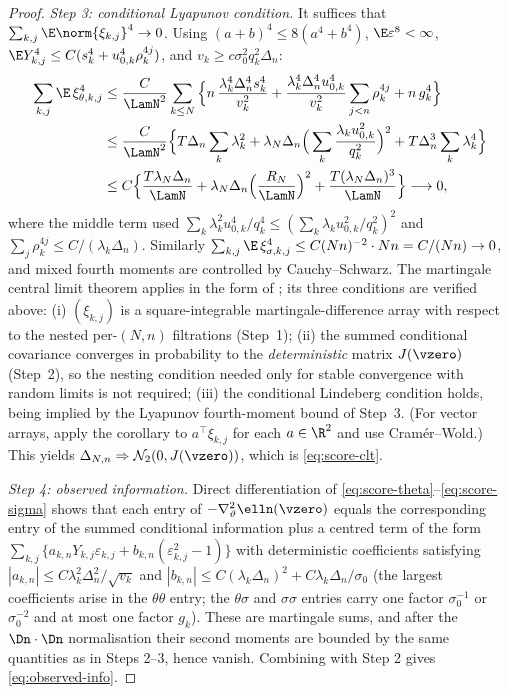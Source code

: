 \begin{proof}
\emph{Step 3: conditional Lyapunov condition.}
It suffices that $\sum_{k,j}\E\norm{\xi_{k,j}}^4\to0$. Using
$(a+b)^4\le8(a^4+b^4)$, $\E\varepsilon^8<\infty$, $\E Y_{k,j}^4\le
C(s_k^4+u_{0,k}^4\rho_k^{4j})$, and $v_k\ge c\sigma_0^2q_k^2\Delta_n$:
\begin{align*}
 \sum_{k,j}\E\,\xi_{\theta,k,j}^4
 &\le\frac{C}{\LamN^2}\sum_{k\le N}
 \Big\{n\,\frac{\lambda_k^4\Delta_n^4s_k^4}{v_k^2}
 +\frac{\lambda_k^4\Delta_n^4u_{0,k}^4}{v_k^2}\sum_{j<n}\rho_k^{4j}
 +n\,g_k^4\Big\}\\
 &\le\frac{C}{\LamN^2}\Big\{T\Delta_n\sum_k\lambda_k^2
 +\lambda_N\Delta_n\Big(\sum_k\frac{\lambda_ku_{0,k}^2}{q_k^2}\Big)^2
 +T\Delta_n^3\sum_k\lambda_k^4\Big\}\\
 &\le C\Big\{\frac{T\lambda_N\Delta_n}{\LamN}
 +\lambda_N\Delta_n\Big(\frac{R_N}{\LamN}\Big)^2
 +\frac{T(\lambda_N\Delta_n)^3}{\LamN}\Big\}
 \longrightarrow0,
\end{align*}
where the middle term used
$\sum_k\lambda_k^2u_{0,k}^4/q_k^4\le(\sum_k\lambda_ku_{0,k}^2/q_k^2)^2$ and
$\sum_j\rho_k^{4j}\le C/(\lambda_k\Delta_n)$. Similarly
$\sum_{k,j}\E\,\xi_{\sigma,k,j}^4\le C(Nn)^{-2}\cdot Nn=C/(Nn)\to0$, and mixed
fourth moments are controlled by Cauchy--Schwarz. The martingale central limit theorem applies in the form of
\citet[Corollary~3.1]{HallHeyde1980}; its three conditions are verified
above: (i) $(\xi_{k,j})$ is a square-integrable martingale-difference array
with respect to the nested per-$(N,n)$ filtrations (Step~1); (ii) the summed
conditional covariance converges in probability to the \emph{deterministic}
matrix $J(\vzero)$ (Step~2), so the nesting condition needed only for
stable convergence with random limits is not required; (iii) the
conditional Lindeberg condition holds, being implied by the Lyapunov
fourth-moment bound of Step~3. (For vector arrays, apply the corollary to
$a^\top\xi_{k,j}$ for each $a\in\R^2$ and use Cram\'er--Wold.) This yields
$\Delta_{N,n}\Rightarrow\mathcal N_2(0,J(\vzero))$, which is
\eqref{eq:score-clt}.

\emph{Step 4: observed information.}
Direct differentiation of \eqref{eq:score-theta}--\eqref{eq:score-sigma} shows
that each entry of $-\nabla^2_\vartheta\elln(\vzero)$ equals the corresponding
entry of the summed conditional information plus a centred term of the form
$\sum_{k,j}\{a_{k,n}Y_{k,j}\varepsilon_{k,j}
+b_{k,n}(\varepsilon_{k,j}^2-1)\}$ with deterministic coefficients satisfying
$|a_{k,n}|\le C\lambda_k^2\Delta_n^2/\sqrt{v_k}$ and
$|b_{k,n}|\le C(\lambda_k\Delta_n)^2+C\lambda_k\Delta_n/\sigma_0$
(the largest coefficients arise in the $\theta\theta$ entry; the
$\theta\sigma$ and $\sigma\sigma$ entries carry one factor
$\sigma_0^{-1}$ or $\sigma_0^{-2}$ and at most one factor $g_k$). These are
martingale sums, and after the $\Dn\cdot\Dn$ normalisation their second
moments are bounded by the same quantities as in Steps 2--3, hence vanish.
Combining with Step 2 gives \eqref{eq:observed-info}.
\end{proof}
